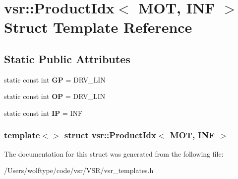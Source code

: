 \hypertarget{structvsr_1_1_product_idx_3_01_m_o_t_00_01_i_n_f_01_4}{\section{vsr\-:\-:Product\-Idx$<$ M\-O\-T, I\-N\-F $>$ Struct Template Reference}
\label{structvsr_1_1_product_idx_3_01_m_o_t_00_01_i_n_f_01_4}
}
\subsection*{Static Public Attributes}
\begin{DoxyCompactItemize}
\item 
\hypertarget{structvsr_1_1_product_idx_3_01_m_o_t_00_01_i_n_f_01_4_a37926dc9e5334b77ff2d2c586a6dc558}{static const int {\bfseries G\-P} = D\-R\-V\-\_\-\-L\-I\-N}\label{structvsr_1_1_product_idx_3_01_m_o_t_00_01_i_n_f_01_4_a37926dc9e5334b77ff2d2c586a6dc558}

\item 
\hypertarget{structvsr_1_1_product_idx_3_01_m_o_t_00_01_i_n_f_01_4_aded70e5dea974f799b6abcaeedb112c7}{static const int {\bfseries O\-P} = D\-R\-V\-\_\-\-L\-I\-N}\label{structvsr_1_1_product_idx_3_01_m_o_t_00_01_i_n_f_01_4_aded70e5dea974f799b6abcaeedb112c7}

\item 
\hypertarget{structvsr_1_1_product_idx_3_01_m_o_t_00_01_i_n_f_01_4_aba5b210525697971f10ba35b31efa1e9}{static const int {\bfseries I\-P} = I\-N\-F}\label{structvsr_1_1_product_idx_3_01_m_o_t_00_01_i_n_f_01_4_aba5b210525697971f10ba35b31efa1e9}

\end{DoxyCompactItemize}
\subsubsection*{template$<$$>$ struct vsr\-::\-Product\-Idx$<$ M\-O\-T, I\-N\-F $>$}



The documentation for this struct was generated from the following file\-:\begin{DoxyCompactItemize}
\item 
/\-Users/wolftype/code/vsr/\-V\-S\-R/vsr\-\_\-templates.\-h\end{DoxyCompactItemize}
